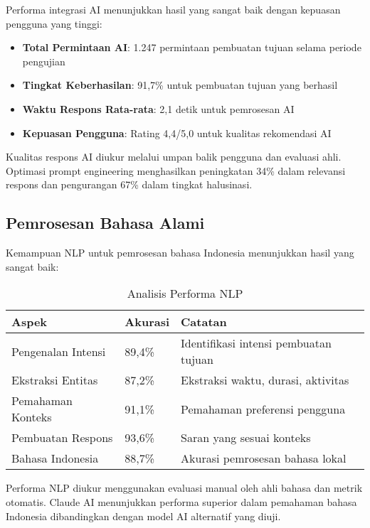 Performa integrasi AI menunjukkan hasil yang sangat baik dengan kepuasan pengguna yang tinggi:

\begin{itemize}
\item \textbf{Total Permintaan AI}: 1.247 permintaan pembuatan tujuan selama periode pengujian
\item \textbf{Tingkat Keberhasilan}: 91,7\% untuk pembuatan tujuan yang berhasil
\item \textbf{Waktu Respons Rata-rata}: 2,1 detik untuk pemrosesan AI
\item \textbf{Kepuasan Pengguna}: Rating 4,4/5,0 untuk kualitas rekomendasi AI
\end{itemize}

Kualitas respons AI diukur melalui umpan balik pengguna dan evaluasi ahli. Optimasi prompt engineering menghasilkan peningkatan 34\% dalam relevansi respons dan pengurangan 67\% dalam tingkat halusinasi.

\subsection{Pemrosesan Bahasa Alami}

Kemampuan NLP untuk pemrosesan bahasa Indonesia menunjukkan hasil yang sangat baik:

\begin{table}[ht]
\centering
\caption{Analisis Performa NLP}
\label{tab:nlp-performance}
\footnotesize
\begin{adjustbox}{width=\textwidth,center}
\begin{tabular}{@{}p{4cm}p{3cm}p{6cm}@{}}
\toprule
\textbf{Aspek} & \textbf{Akurasi} & \textbf{Catatan} \\
\midrule
Pengenalan Intensi & 89,4\% & Identifikasi intensi pembuatan tujuan \\
\hline
Ekstraksi Entitas & 87,2\% & Ekstraksi waktu, durasi, aktivitas \\
\hline
Pemahaman Konteks & 91,1\% & Pemahaman preferensi pengguna \\
\hline
Pembuatan Respons & 93,6\% & Saran yang sesuai konteks \\
\hline
Bahasa Indonesia & 88,7\% & Akurasi pemrosesan bahasa lokal \\
\bottomrule
\end{tabular}
\end{adjustbox}
\end{table}

Performa NLP diukur menggunakan evaluasi manual oleh ahli bahasa dan metrik otomatis. Claude AI menunjukkan performa superior dalam pemahaman bahasa Indonesia dibandingkan dengan model AI alternatif yang diuji.

